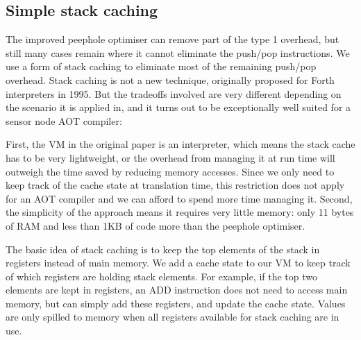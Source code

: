 
\subsection{Simple stack caching}
\label{sec-optimisations-simple-stack-caching}

The improved peephole optimiser can remove part of the type 1 overhead, but still many cases remain where it cannot eliminate the push/pop instructions. We use a form of stack caching \cite{Ertl:1995dv} to eliminate most of the remaining push/pop overhead. Stack caching is not a new technique, originally proposed for Forth interpreters in 1995. But the tradeoffs involved are very different depending on the scenario it is applied in, and it turns out to be exceptionally well suited for a sensor node AOT compiler:

First, the VM in the original paper is an interpreter, which means the stack cache has to be very lightweight, or the overhead from managing it at run time will outweigh the time saved by reducing memory accesses. Since we only need to keep track of the cache state at translation time, this restriction does not apply for an AOT compiler and we can afford to spend more time managing it. Second, the simplicity of the approach means it requires very little memory: only 11 bytes of RAM and less than 1KB of code more than the peephole optimiser.

The basic idea of stack caching is to keep the top elements of the stack in registers instead of main memory. We add a cache state to our VM to keep track of which registers are holding stack elements. For example, if the top two elements are kept in registers, an ADD instruction does not need to access main memory, but can simply add these registers, and update the cache state. Values are only spilled to memory when all registers available for stack caching are in use.

